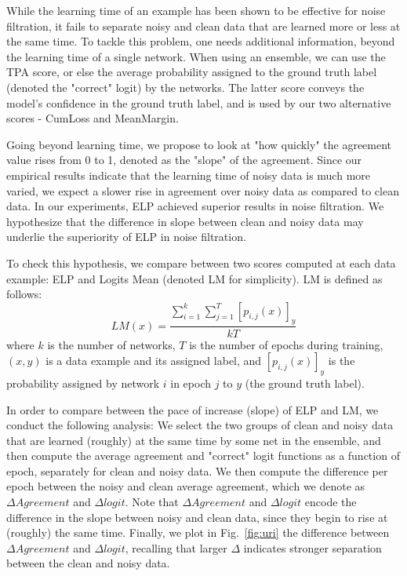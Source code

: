 \documentclass{article}
\begin{document}
While the learning time of an example has been shown to be effective for noise filtration, it fails to separate noisy and clean data that are learned more or less at the same time. To tackle this problem, one needs additional information, beyond the learning time of a single network. When using an ensemble, we can use the TPA score, or else the average probability assigned to the ground truth label (denoted the "correct" logit) by the networks. The latter score conveys the model's confidence in the ground truth label, and is used by our two alternative scores - CumLoss and MeanMargin. 

Going beyond learning time, we propose to look at "how quickly" the agreement value rises from 0 to 1, denoted as the "slope" of the agreement. Since our empirical results indicate that the learning time of noisy data is much more varied, we expect a slower rise in agreement over noisy data as compared to clean data. In our experiments, ELP achieved superior results in noise filtration. We hypothesize that the difference in slope between clean and noisy data may underlie the superiority of ELP in noise filtration.

To check this hypothesis, we compare between two scores computed at each data example: ELP and Logits Mean (denoted LM for simplicity). LM is defined as follows:
\[LM(x) = \frac{\sum_{i=1}^k \sum_{j=1}^T{[p_{i,j}(x)]_y}}{kT}\]
where $k$ is the number of networks, $T$ is the number of epochs during training, $(x,y)$ is a data example and its assigned label, and $[p_{i,j}(x)]_y$ is the probability assigned by network $i$ in epoch $j$ to $y$ (the ground truth label). 

In order to compare between the pace of increase (slope) of ELP and LM, we conduct the following analysis: We select the two groups of clean and noisy data that are learned (roughly) at the same time by some net in the ensemble, and then compute the average agreement and "correct" logit functions as a function of epoch, separately for clean and noisy data. We then compute the difference per epoch between the noisy and clean average agreement, which we denote as $\Delta Agreement$ and $\Delta logit$. Note that $\Delta Agreement$ and $\Delta logit$ encode the difference in the slope between noisy and clean data, since they begin to rise at (roughly) the same time. Finally, we plot in Fig.~\ref{fig:uri} the difference between $\Delta Agreement$ and $\Delta logit$, recalling that larger $\Delta$ indicates stronger separation between the clean and noisy data. %
\end{document}
